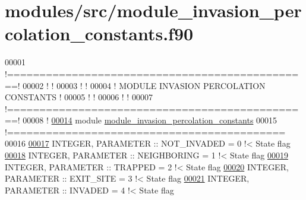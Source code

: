 \hypertarget{module__invasion__percolation__constants_8f90_source}{
\section{modules/src/module\-\_\-invasion\-\_\-percolation\-\_\-constants.f90}
}

\begin{DoxyCode}
00001 \textcolor{comment}{!===============================================!}
00002 \textcolor{comment}{!                                               !}
00003 \textcolor{comment}{!                                               !}
00004 \textcolor{comment}{!     MODULE INVASION PERCOLATION CONSTANTS     !}
00005 \textcolor{comment}{!                                               !}
00006 \textcolor{comment}{!                                               !}
00007 \textcolor{comment}{!===============================================!}
00008 \textcolor{comment}{!}
\hypertarget{module__invasion__percolation__constants_8f90_source_l00014}{}\hyperlink{classmodule__invasion__percolation__constants}{00014} \textcolor{keyword}{module} \hyperlink{classmodule__invasion__percolation__constants}{module_invasion_percolation_constants}
00015 \textcolor{comment}{!===========================================}
00016 
\hypertarget{module__invasion__percolation__constants_8f90_source_l00017}{}\hyperlink{classmodule__invasion__percolation__constants_a7fecbd7b24fc856a8381da245555eb59}{00017} \textcolor{keywordtype}{INTEGER}, \textcolor{keywordtype}{PARAMETER} :: NOT\_INVADED = 0 \textcolor{comment}{!< State flag}
\hypertarget{module__invasion__percolation__constants_8f90_source_l00018}{}\hyperlink{classmodule__invasion__percolation__constants_ab5922cbf1e44fb051d2e4f53bd488a5b}{00018} \textcolor{keywordtype}{INTEGER}, \textcolor{keywordtype}{PARAMETER} :: NEIGHBORING = 1 \textcolor{comment}{!< State flag}
\hypertarget{module__invasion__percolation__constants_8f90_source_l00019}{}\hyperlink{classmodule__invasion__percolation__constants_ae0a7d5e563590985dcfc6ef48fb2680c}{00019} \textcolor{keywordtype}{INTEGER}, \textcolor{keywordtype}{PARAMETER} :: TRAPPED     = 2 \textcolor{comment}{!< State flag}
\hypertarget{module__invasion__percolation__constants_8f90_source_l00020}{}\hyperlink{classmodule__invasion__percolation__constants_a91f942526d67d154ae5ec76baccbf12e}{00020} \textcolor{keywordtype}{INTEGER}, \textcolor{keywordtype}{PARAMETER} :: EXIT\_SITE   = 3 \textcolor{comment}{!< State flag}
\hypertarget{module__invasion__percolation__constants_8f90_source_l00021}{}\hyperlink{classmodule__invasion__percolation__constants_a60e99c2c35344e991e5955bf347d2516}{00021} \textcolor{keywordtype}{INTEGER}, \textcolor{keywordtype}{PARAMETER} :: INVADED     = 4 \textcolor{comment}{!< State flag}

\end{DoxyCode}
